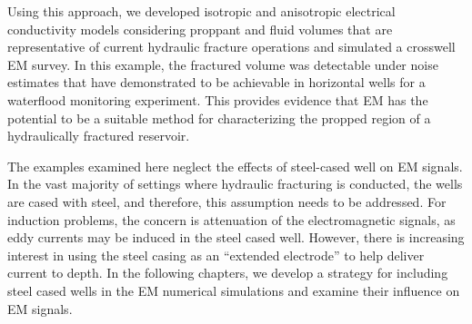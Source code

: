 Using this approach, we developed isotropic and anisotropic electrical conductivity models considering proppant and fluid volumes that are representative of current hydraulic fracture operations and simulated a crosswell EM survey. In this example, the fractured volume was detectable under noise estimates that have demonstrated to be achievable in horizontal wells for a waterflood monitoring experiment. This provides evidence that EM has the potential to be a suitable method for characterizing the propped region of a hydraulically fractured reservoir.

The examples examined here neglect the effects of steel-cased well on EM signals. In the vast majority of settings where hydraulic fracturing is conducted, the wells are cased with steel, and therefore, this assumption needs to be addressed. For induction problems, the concern is attenuation of the electromagnetic signals, as eddy currents may be induced in the steel cased well. However, there is increasing interest in using the steel casing as an ``extended electrode'' to help deliver current to depth. In the following chapters, we develop a strategy for including steel cased wells in the EM numerical simulations and examine their influence on EM signals.



